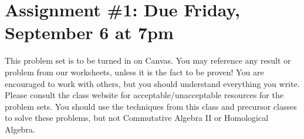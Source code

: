 \documentclass[12pt]{amsart}
\newcommand{\showsol}[1]{\def\displaysol{#1}}
\begin{document}
\showsol{1}
	
	\thispagestyle{empty}
	
	\section*{Assignment \#1: Due Friday, September 6 at 7pm}
	
	This problem set is to be turned in on Canvas. You may reference any result or problem from our worksheets, unless it is the fact to be proven! You are encouraged to work with others, but you should understand everything you write. Please consult the class website for acceptable/unacceptable resources for the problem sets. You should use the techniques from this class and precursor classes to solve these problems, but not Commutative Algebra II or Homological Algebra. 
	
	\
	
	
	
\end{document}
